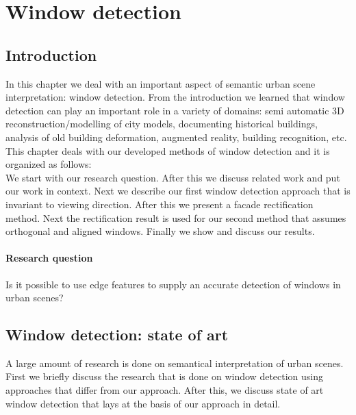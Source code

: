 
\section{Window detection}
\label{sec:windowDetection}
\subsection{Introduction}
In this chapter we deal with an important aspect of semantic urban scene interpretation: window detection. 
From the introduction we learned that window detection can play an important role in
a variety of domains: semi automatic 3D reconstruction/modelling of city models, documenting
historical buildings, analysis of old building deformation, augmented
reality, building recognition, etc.\\

This chapter deals with our developed methods of window detection and it is organized
as follows:\\
  We start with our research question. After this we discuss related work and put our work in context.  Next we describe our first
  window detection approach that is invariant to viewing direction.  After this
  we present a facade rectification method. Next the rectification result is used for our
  second method that assumes orthogonal and aligned windows.  Finally we show
  and discuss our results. 

\paragraph{Research question}
Is it possible to use edge features to supply an accurate detection of windows in
urban scenes?

\subsection{Window detection: state of art} %
A large amount of research is done on semantical interpretation of urban scenes. 
First we briefly discuss the research that is done on window detection using
approaches that differ from our approach.  After this, we discuss state of art
window detection that lays at the basis of our approach in detail.\\

